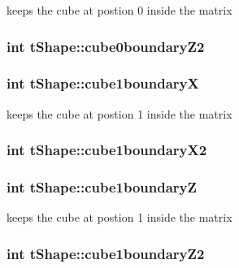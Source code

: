 keeps the cube at postion 0 inside the matrix \hypertarget{classt_shape_ab587a6654689689ee6b94d10f6105082}{
\subsubsection[{cube0boundary\-Z2}]{\setlength{\rightskip}{0pt plus 5cm}int t\-Shape\-::cube0boundary\-Z2}}\label{classt_shape_ab587a6654689689ee6b94d10f6105082}
\hypertarget{classt_shape_a5b7cbdbe623f5a877f84b82b70b5dbbb}{
\subsubsection[{cube1boundary\-X}]{\setlength{\rightskip}{0pt plus 5cm}int t\-Shape\-::cube1boundary\-X}}\label{classt_shape_a5b7cbdbe623f5a877f84b82b70b5dbbb}
keeps the cube at postion 1 inside the matrix \hypertarget{classt_shape_afc1aab26cc9f3f2469d8080d3f4db30b}{
\subsubsection[{cube1boundary\-X2}]{\setlength{\rightskip}{0pt plus 5cm}int t\-Shape\-::cube1boundary\-X2}}\label{classt_shape_afc1aab26cc9f3f2469d8080d3f4db30b}
\hypertarget{classt_shape_ae1d93af37253f5dd2e59b35366fdd8ef}{
\subsubsection[{cube1boundary\-Z}]{\setlength{\rightskip}{0pt plus 5cm}int t\-Shape\-::cube1boundary\-Z}}\label{classt_shape_ae1d93af37253f5dd2e59b35366fdd8ef}
keeps the cube at postion 1 inside the matrix \hypertarget{classt_shape_af5ef08112c5ac489c6ab89a445563cbd}{
\subsubsection[{cube1boundary\-Z2}]{\setlength{\rightskip}{0pt plus 5cm}int t\-Shape\-::cube1boundary\-Z2}}\label{classt_shape_af5ef08112c5ac489c6ab89a445563cbd}

